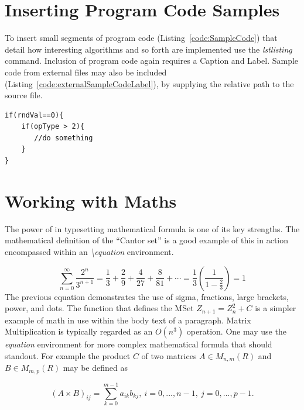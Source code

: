 \section{Inserting Program Code Samples}

To insert small segments of program code (Listing~\ref{code:SampleCode}) that detail how interesting algorithms and so forth are implemented use the \emph{lstlisting} command. Inclusion of program code again requires a Caption and Label. Sample code from external files may also be included (Listing~\ref{code:externalSampleCodeLabel}), by supplying the relative path to the source file. 

\begin{lstlisting}[caption=Sample Program Code Listing, label=code:SampleCode]
if(rndVal==0){
    if(opType > 2){
       //do something
    }
}
\end{lstlisting}




\section{Working with Maths}
The power of \latex in typesetting mathematical formula is one of its key strengths. The mathematical definition of the ``Cantor set'' is a good example of this in action encompassed within an \emph{\textbackslash equation} environment.

\begin{equation}
\displaystyle\sum_{n=0}^\infty \frac{2^n}{3^{n+1}} = \frac{1}{3} +
\frac{2}{9} + \frac{4}{27} + \frac{8}{81} + \cdots =
\frac{1}{3}\left(\frac{1}{1-\frac{2}{3}}\right) = 1
\end{equation}
 The previous equation demonstrates the use of sigma, fractions, large brackets, power, and dots. The function that defines the MSet $Z_{n+1} =
Z_{n}^2 + C$ is a simpler example of math in use within the body text of a paragraph. Matrix Multiplication is typically regarded as an $O(n^3)$
operation. One may use the \emph{equation} environment for more complex mathematical formula that should standout. For example the product  $C$ of two matrices $A \in M_{n,m}(R)$ and $B \in
M_{m,p}(R)$ may be defined as

\begin{equation}
(A \times B)_{ij} = \sum_{k=0} ^{m-1} a_{ik}b_{kj},~
i=0,...,n-1,~j=0,...,p-1.
\end{equation}

